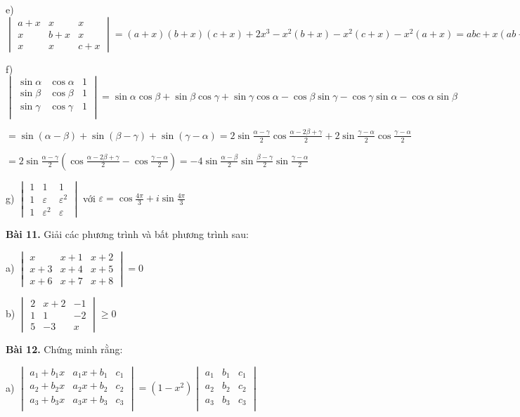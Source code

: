 \documentclass[12pt]{report}
\begin{document}
e) $\begin{vmatrix}
a+x & x & x \\
x & b+x & x \\
x & x & c+x
\end{vmatrix} = (a+x)(b+x)(c+x) + 2x^3 - x^2(b+x) - x^2(c+x) - x^2(a+x) = abc + x(ab + ac + bc)$

f) $\begin{vmatrix}
\sin \alpha & \cos \alpha & 1 \\
\sin \beta & \cos \beta & 1 \\
\sin \gamma & \cos \gamma & 1 \\
\end{vmatrix} =\sin\alpha\cos\beta+\sin\beta\cos\gamma+\sin\gamma\cos\alpha - \cos\beta\sin\gamma-\cos\gamma\sin\alpha-\cos\alpha\sin\beta$

$= \sin(\alpha - \beta) + \sin(\beta - \gamma) + \sin(\gamma - \alpha) = 2\sin \frac{\alpha - \gamma}{2} \cos \frac{\alpha - 2\beta + \gamma}{2} + 2\sin \frac{\gamma - \alpha}{2} \cos \frac{\gamma - \alpha}{2}$

$= 2 \sin \frac{\alpha - \gamma}{2}(\cos \frac{\alpha - 2\beta + \gamma}{2} - \cos \frac{\gamma - \alpha}{2}) = -4\sin \frac{\alpha - \beta}{2}\sin \frac{\beta-\gamma}{2}\sin \frac{\gamma-\alpha}{2}$

g) $\begin{vmatrix}
	1 & 1 & 1 \\
	1 & \varepsilon & \varepsilon^2 \\
	1 & \varepsilon^2 & \varepsilon
\end{vmatrix}$ với $\varepsilon = \cos \frac{4\pi}{3} + i\sin \frac{4\pi}{3}$

\textbf{Bài 11.} Giải các phương trình và bất phương trình sau: 

a) $\begin{vmatrix}
	x & x+1 & x+2 \\
	x+3 & x+4 & x+5 \\
	x+6 & x+7 & x+8
\end{vmatrix} = 0$

b) $\begin{vmatrix}
	2 & x+2 & -1 \\
	1 & 1 & -2 \\
	5 & -3 & x
\end{vmatrix} \geq 0$

\textbf{Bài 12.} Chứng minh rằng: 

a) $\begin{vmatrix}
	a_1+b_1x & a_1x+b_1 & c_1 \\
	a_2+b_2x & a_2x+b_2 & c_2 \\
	a_3+b_3x & a_3x+b_3 & c_3 \\
\end{vmatrix} = (1-x^2) \begin{vmatrix}
	a_1 & b_1 & c_1 \\ 
	a_2 & b_2 & c_2 \\
	a_3 & b_3 & c_3 \\
\end{vmatrix}$
\end{document}
